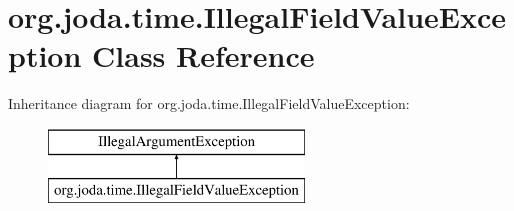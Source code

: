 \hypertarget{classorg_1_1joda_1_1time_1_1_illegal_field_value_exception}{\section{org.\-joda.\-time.\-Illegal\-Field\-Value\-Exception Class Reference}
\label{classorg_1_1joda_1_1time_1_1_illegal_field_value_exception}
}
Inheritance diagram for org.\-joda.\-time.\-Illegal\-Field\-Value\-Exception\-:\begin{figure}[H]
\begin{center}
\leavevmode
\includegraphics[height=2.000000cm]{classorg_1_1joda_1_1time_1_1_illegal_field_value_exception}
\end{center}
\end{figure}
